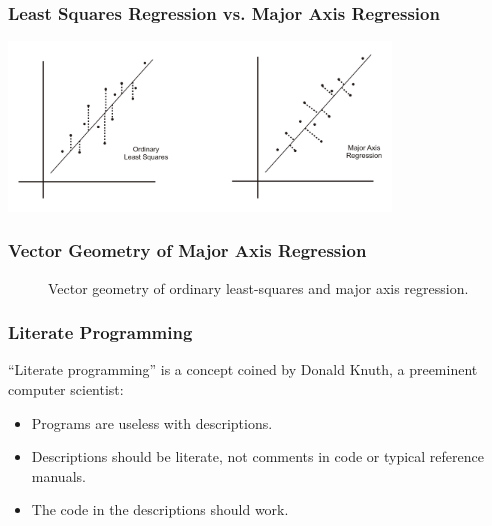 \documentclass{beamer}
\begin{document}
\begin{frame}
  \frametitle{Least Squares Regression vs. Major Axis Regression}
\begin{center}
\includegraphics[width=4in]{ols_vs_majoraxis}
\end{center}
\end{frame}




\begin{frame}
  \frametitle{Vector Geometry of Major Axis Regression}

\begin{figure}
\begin{center}
\end{center}
\caption{Vector geometry of ordinary least-squares and major axis regression.}
\end{figure}


\end{frame}




\begin{frame}
  \frametitle{Literate Programming}

``Literate programming'' is a concept coined by Donald Knuth, a preeminent computer scientist:

\begin{itemize}

 \item Programs are useless with descriptions.
 \item Descriptions should be literate, not comments in code or typical reference manuals.
 \item The code in the descriptions should work.
\end{itemize}

\end{frame}
\end{document}
